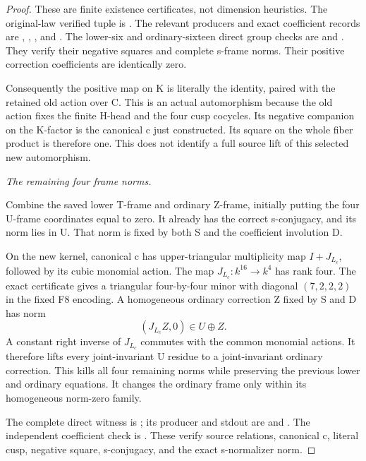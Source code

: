 \begin{proof}
These are finite existence certificates, not dimension heuristics.
The original-law verified tuple is
.
The relevant producers and exact coefficient records are
,
,
, and
.
The lower-six and ordinary-sixteen direct group checks are
 and
.
They verify their negative squares and complete s-frame norms.
Their positive correction coefficients are identically zero.

Consequently the positive map on K is literally the identity,
paired with the retained old action over C. This is an actual
automorphism because the old action fixes the finite H-head and
the four cusp cocycles. Its negative companion on the K-factor
is the canonical c just constructed. Its square on the whole
fiber product is therefore one. This does not identify a full
source lift of this selected new automorphism.

\emph{The remaining four frame norms.}\par
Combine the saved lower T-frame and ordinary Z-frame, initially
putting the four U-frame coordinates equal to zero. It already
has the correct s-conjugacy, and its norm lies in U. That norm
is fixed by both S and the coefficient involution D.

On the new kernel, canonical c has upper-triangular multiplicity
map \(I+J_{L_c}\), followed by its cubic monomial action.
The map \(J_{L_c}:k^{16}\to k^4\) has rank four. The exact
certificate gives a triangular four-by-four minor with diagonal
\((7,2,2,2)\) in the fixed F8 encoding. A homogeneous ordinary
correction Z fixed by S and D has norm
\[
 (J_{L_c}Z,0)\in U\oplus Z.
 \tag{A.66.6}
\]
A constant right inverse of \(J_{L_c}\) commutes with the common
monomial actions. It therefore lifts every joint-invariant U
residue to a joint-invariant ordinary correction. This kills all
four remaining norms while preserving the previous lower and
ordinary equations. It changes the ordinary frame only within
its homogeneous norm-zero family.

The complete direct witness is
; its producer
and stdout are
 and
.
The independent coefficient check is
.
These verify source relations, canonical c, literal cusp,
negative square, s-conjugacy, and the exact s-normalizer norm.


\end{proof}
